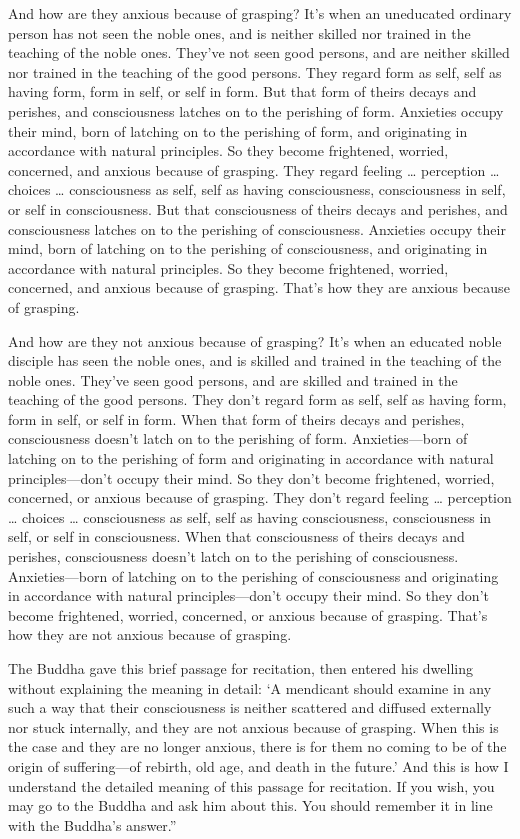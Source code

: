 \documentclass[12pt,openany]{book}%
\begin{document}
And how are they anxious because of grasping? It’s when an uneducated ordinary person has not seen the noble ones, and is neither skilled nor trained in the teaching of the noble ones. They’ve not seen good persons, and are neither skilled nor trained in the teaching of the good persons. They regard form as self, self as having form, form in self, or self in form. But that form of theirs decays and perishes, and consciousness latches on to the perishing of form. Anxieties occupy their mind, born of latching on to the perishing of form, and originating in accordance with natural principles. So they become frightened, worried, concerned, and anxious because of grasping. They regard feeling … perception … choices … consciousness as self, self as having consciousness, consciousness in self, or self in consciousness. But that consciousness of theirs decays and perishes, and consciousness latches on to the perishing of consciousness. Anxieties occupy their mind, born of latching on to the perishing of consciousness, and originating in accordance with natural principles. So they become frightened, worried, concerned, and anxious because of grasping. That’s how they are anxious because of grasping. 

And how are they not anxious because of grasping? It’s when an educated noble disciple has seen the noble ones, and is skilled and trained in the teaching of the noble ones. They’ve seen good persons, and are skilled and trained in the teaching of the good persons. They don’t regard form as self, self as having form, form in self, or self in form. When that form of theirs decays and perishes, consciousness doesn’t latch on to the perishing of form. Anxieties—born of latching on to the perishing of form and originating in accordance with natural principles—don’t occupy their mind. So they don’t become frightened, worried, concerned, or anxious because of grasping. They don’t regard feeling … perception … choices … consciousness as self, self as having consciousness, consciousness in self, or self in consciousness. When that consciousness of theirs decays and perishes, consciousness doesn’t latch on to the perishing of consciousness. Anxieties—born of latching on to the perishing of consciousness and originating in accordance with natural principles—don’t occupy their mind. So they don’t become frightened, worried, concerned, or anxious because of grasping. That’s how they are not anxious because of grasping. 

The Buddha gave this brief passage for recitation, then entered his dwelling without explaining the meaning in detail: ‘A mendicant should examine in any such a way that their consciousness is neither scattered and diffused externally nor stuck internally, and they are not anxious because of grasping. When this is the case and they are no longer anxious, there is for them no coming to be of the origin of suffering—of rebirth, old age, and death in the future.’ And this is how I understand the detailed meaning of this passage for recitation. If you wish, you may go to the Buddha and ask him about this. You should remember it in line with the Buddha’s answer.” 
\end{document}
